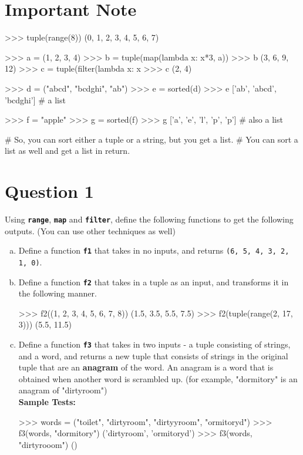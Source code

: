 \section{Important Note}
\begin{python}
>>> tuple(range(8))
(0, 1, 2, 3, 4, 5, 6, 7)

>>> a = (1, 2, 3, 4)
>>> b = tuple(map(lambda x: x*3, a))
>>> b
(3, 6, 9, 12)
>>> c = tuple(filter(lambda x: x %
>>> c
(2, 4)

>>> d = ("abcd", "bcdghi", "ab")
>>> e = sorted(d)
>>> e
['ab', 'abcd', 'bcdghi'] # a list

>>> f = "apple"
>>> g = sorted(f)
>>> g
['a', 'e', 'l', 'p', 'p'] # also a list

# So, you can sort either a tuple or a string, but you get a list.
# You can sort a list as well and get a list in return.
\end{python}

\section{Question 1}
Using \texttt{\bfseries range}, \texttt{\bfseries map} and \texttt{\bfseries filter}, define the
following functions to get the following outputs. (You can use other techniques as well)
\begin{enumerate}[(a)]
\item Define a function \texttt{\bfseries f1} that takes in no inputs, and returns \texttt{(6, 5, 4, 3, 2, 1, 0)}.

\item Define a function \texttt{\bfseries f2} that takes in a tuple as an input, and transforms it in the following
manner.
\begin{python}
>>> f2((1, 2, 3, 4, 5, 6, 7, 8))
(1.5, 3.5, 5.5, 7.5)
>>> f2(tuple(range(2, 17, 3)))
(5.5, 11.5)
\end{python}

\newpage
\item Define a function \texttt{\bfseries f3} that takes in two inputs - a tuple consisting of strings, and a word,
and returns a new tuple that consists of strings in the original tuple that are an \textbf{anagram} of the
word. An anagram is a word that is obtained when another word is scrambled up. (for example, "dormitory" is an
anagram of "dirtyroom") \\
\textbf{Sample Tests:}
\begin{python}
>>> words = ("toilet", "dirtyroom", "dirtyyroom", "ormitoryd")
>>> f3(words, "dormitory")
('dirtyroom', 'ormitoryd')
>>> f3(words, "dirtyrooom")
()
\end{python}
\end{enumerate}

